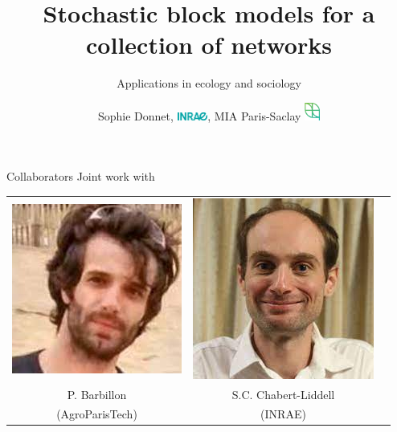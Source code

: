 \documentclass[compress,10pt]{beamer}
\title{Stochastic block models for  a collection  of networks}
\subtitle{Applications in ecology and sociology}
\date{}
\author{Sophie  Donnet,  \includegraphics[width= 1cm]{plots/Logo-INRAE},    MIA Paris-Saclay \includegraphics[width= 0.5cm]{plots/MIAPS}}
\institute{Aug. 2023}
\begin{document}
\maketitle



\begin{frame}{Collaborators}
 Joint work with 
 
\begin{center}
\begin{tabular}{ccc}
\includegraphics[width = 0.25\linewidth]{plots/Barbillon}& \includegraphics[width = 0.25\linewidth]{plots/saintclair} \\
 \scriptsize P. Barbillon & \scriptsize S.C. Chabert-Liddell\\
 \scriptsize (AgroParisTech) & \scriptsize (INRAE) 
\end{tabular}
\end{center}

 
\end{frame}
\end{document}

